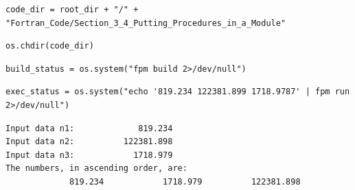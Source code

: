 \begin{verbatim}
code_dir = root_dir + "/" + "Fortran_Code/Section_3_4_Putting_Procedures_in_a_Module"
\end{verbatim}

\begin{verbatim}
os.chdir(code_dir)
\end{verbatim}

\begin{verbatim}
build_status = os.system("fpm build 2>/dev/null")
\end{verbatim}

\begin{verbatim}
exec_status = os.system("echo '819.234 122381.899 1718.9787' | fpm run 2>/dev/null")
\end{verbatim}

\begin{verbatim}
Input data n1:             819.234
Input data n2:          122381.898
Input data n3:            1718.979
The numbers, in ascending order, are:
             819.234            1718.979          122381.898
\end{verbatim}